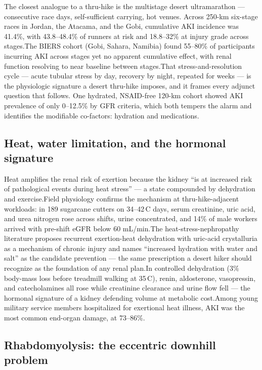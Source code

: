 \documentclass[11pt]{article}
\newcommand{\src}[1]{\allowbreak[#1]}
\begin{document}
The closest analogue to a thru-hike is the multistage desert ultramarathon --- consecutive race days, self-sufficient carrying, hot venues. Across 250-km six-stage races in Jordan, the Atacama, and the Gobi, cumulative AKI incidence was 41.4\%, with 43.8--48.4\% of runners at risk and 18.8--32\% at injury grade across stages.\src{167} The BIERS cohort (Gobi, Sahara, Namibia) found 55--80\% of participants incurring AKI across stages yet no apparent cumulative effect, with renal function resolving to near baseline between stages.\src{168} That stress-and-resolution cycle --- acute tubular stress by day, recovery by night, repeated for weeks --- is the physiologic signature a desert thru-hike imposes, and it frames every adjunct question that follows. One hydrated, NSAID-free 120-km cohort showed AKI prevalence of only 0--12.5\% by GFR criteria, which both tempers the alarm and identifies the modifiable co-factors: hydration and medications.\src{165}

\subsection{Heat, water limitation, and the hormonal signature}

Heat amplifies the renal risk of exertion because the kidney ``is at increased risk of pathological events during heat stress'' --- a state compounded by dehydration and exercise.\src{169} Field physiology confirms the mechanism at thru-hike-adjacent workloads: in 189 sugarcane cutters on 34--42\,\textdegree C days, serum creatinine, uric acid, and urea nitrogen rose across shifts, urine concentrated, and 14\% of male workers arrived with pre-shift eGFR below 60 mL/min.\src{170} The heat-stress-nephropathy literature proposes recurrent exertion-heat dehydration with uric-acid crystalluria as a mechanism of chronic injury and names ``increased hydration with water and salt'' as the candidate prevention --- the same prescription a desert hiker should recognize as the foundation of any renal plan.\src{171} In controlled dehydration (3\% body-mass loss before treadmill walking at 35\,\textdegree C), renin, aldosterone, vasopressin, and catecholamines all rose while creatinine clearance and urine flow fell --- the hormonal signature of a kidney defending volume at metabolic cost.\src{174} Among young military service members hospitalized for exertional heat illness, AKI was the most common end-organ damage, at 73--86\%.\src{173}

\subsection{Rhabdomyolysis: the eccentric downhill problem}
\end{document}
